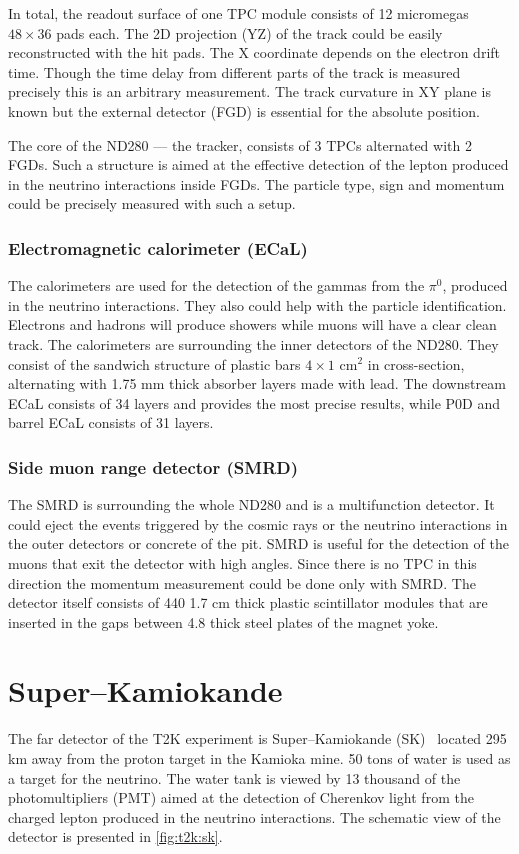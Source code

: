 \documentclass[../main.tex]{subfiles}
\begin{document}
In total, the readout surface of one TPC module consists of 12 micromegas $48\times36$ pads each. The 2D projection (YZ) of the track could be easily reconstructed with the hit pads. The X coordinate depends on the electron drift time. Though the time delay from different parts of the track is measured precisely this is an arbitrary measurement. The track curvature in XY plane is known but the external detector (FGD) is essential for the absolute position.

The core of the ND280 --- the tracker, consists of 3 TPCs alternated with 2 FGDs. Such a structure is aimed at the effective detection of the lepton produced in the neutrino interactions inside FGDs. The particle type, sign and momentum could be precisely measured with such a setup.

\subsubsection{Electromagnetic calorimeter (ECaL)}
The calorimeters are used for the detection of the gammas from the $\pi^0$, produced in the neutrino interactions. They also could help with the particle identification. Electrons and hadrons will produce showers while muons will have a clear clean track. The calorimeters are surrounding the inner detectors of the ND280. They consist of the sandwich structure of plastic bars $4\times1$ $\text{cm}^2$ in cross-section, alternating with 1.75 mm thick absorber layers made with lead. The downstream ECaL consists of 34 layers and provides the most precise results, while P0D and barrel ECaL consists of 31 layers.

\subsubsection{Side muon range detector (SMRD)}
The SMRD is surrounding the whole ND280 and is a multifunction detector. It could eject the events triggered by the cosmic rays or the neutrino interactions in the outer detectors or concrete of the pit. SMRD is useful for the detection of the muons that exit the detector with high angles. Since there is no TPC in this direction the momentum measurement could be done only with SMRD. The detector itself consists of 440 1.7 cm thick plastic scintillator modules that are inserted in the gaps between 4.8 thick steel plates of the magnet yoke.


\section{Super--Kamiokande}
\label{sec:T2K:sk}
The far detector of the T2K experiment is Super--Kamiokande (SK)~\cite{Fukuda2003} located 295 km away from the proton target in the Kamioka mine. 50 tons of water is used as a target for the neutrino. The water tank is viewed by 13 thousand of the photomultipliers (PMT) aimed at the detection of Cherenkov light from the charged lepton produced in the neutrino interactions. The schematic view of the detector is presented in \autoref{fig:t2k:sk}.
\end{document}
